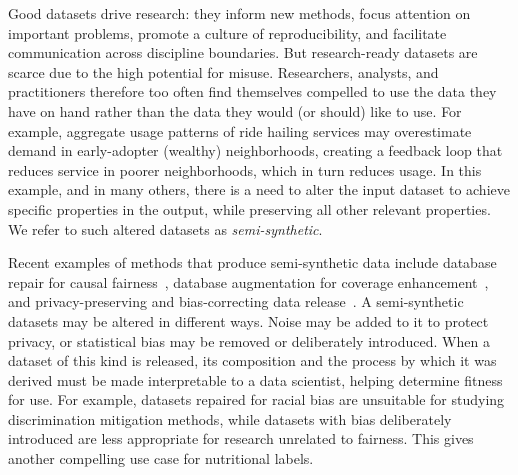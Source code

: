 Good datasets drive research: they inform new methods, focus attention on important problems, promote a culture of reproducibility, and facilitate communication across discipline boundaries.  But research-ready datasets are scarce due to the high potential for misuse. Researchers, analysts, and practitioners therefore too often find themselves compelled to use the data they have on hand rather than the data they would (or should) like to use.  For example, aggregate usage patterns of ride hailing services may overestimate demand in early-adopter (\ie wealthy) neighborhoods, creating a feedback loop that reduces service in poorer neighborhoods, which in turn reduces usage.  In this example, and in many others, there is a need to alter the input dataset to achieve specific properties in the output, while preserving all other relevant properties.  We refer to such altered datasets as \textit{semi-synthetic}.

Recent examples of methods that produce semi-synthetic data include database repair for causal fairness~\cite{DBLP:conf/sigmod/SalimiRHS19}, database augmentation for coverage enhancement~\cite{DBLP:conf/icde/AsudehJJ19}, and privacy-preserving and bias-correcting data release~\cite{DBLP:conf/ssdbm/PingSH17,DBLP:conf/vldb/RodriguezSPSH18}. A semi-synthetic datasets may be altered in different ways.  Noise may be added to it to protect privacy, or statistical bias may be removed or deliberately introduced.  When a dataset of this kind is released, its composition and the process by which it was derived must be made interpretable to a data scientist, helping determine fitness for use.  For example, datasets repaired for racial bias are unsuitable for studying discrimination mitigation methods, while datasets with bias deliberately introduced are less appropriate for research unrelated to fairness.   This gives another compelling use case for nutritional labels.



